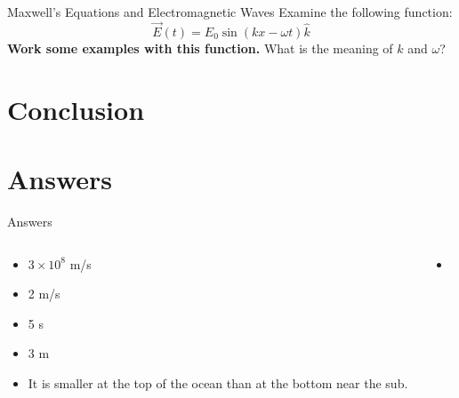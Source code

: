 \documentclass{beamer}
\begin{document}
\begin{frame}{Maxwell's Equations and Electromagnetic Waves}
Examine the following function:
\begin{equation}
\vec{E}(t) = E_0 \sin\left(k x - \omega t\right) \hat{k}
\end{equation}
\textbf{Work some examples with this function.}  What is the meaning of $k$ and $\omega$?
\end{frame}

\section{Conclusion}

\section{Answers}

\begin{frame}{Answers}
\tiny
\begin{columns}[T]
\begin{column}{0.5\textwidth}
\begin{itemize}
\item $3 \times 10^{8}$ m/s
\item 2 m/s
\item 5 s
\item 3 m
\item It is smaller at the top of the ocean than at the bottom near the sub.
\end{itemize}
\end{column}
\begin{column}{0.5\textwidth}
\begin{itemize}
\item 
\end{itemize}
\end{column}
\end{columns}
\end{frame}
\end{document}
